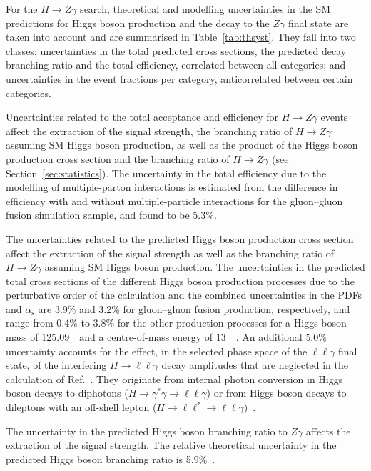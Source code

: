 For the $H\to Z\gamma$ search, theoretical and modelling uncertainties in the 
SM predictions for
Higgs boson production and the decay to the $Z\gamma$ final state are taken into account and
are summarised in Table~\ref{tab:thsyst}. 
They fall into
two classes: uncertainties in the total predicted cross sections, the predicted decay 
branching ratio and the total efficiency, correlated between all categories; 
and uncertainties in the event fractions per category, anticorrelated between certain
categories.

Uncertainties related to the total acceptance and efficiency for $H\to Z\gamma$ events
affect the extraction of the signal strength, the branching ratio of $H\to Z\gamma$
assuming SM Higgs boson production, as well as the product of the Higgs boson production
cross section and the branching ratio of $H\to Z\gamma$ (see Section~\ref{sec:statistics}).
The uncertainty in the total efficiency due to the modelling of multiple-parton 
interactions
is estimated from the difference in efficiency with and without multiple-particle interactions 
for the gluon--gluon fusion simulation sample, and found to be 5.3\%.

The uncertainties related to the predicted Higgs boson production cross section affect
the extraction of the signal strength as well as the branching ratio of $H\to Z\gamma$
assuming SM Higgs boson production.
The uncertainties in the predicted total cross sections of the different Higgs 
boson production processes due to the perturbative order of the calculation
and the combined uncertainties in the PDFs and $\alpha_\mathrm{s}$ are 3.9\% and 3.2\% for gluon--gluon fusion
production, respectively, 
and range from 0.4\% to 3.8\% for the other production processes for a Higgs boson mass of 125.09~\GeV\ and
a centre-of-mass energy of 13~\TeV~\cite{deFlorian:2016spz}.  
An additional $5.0\%$~\cite{Dicus:2013lta} uncertainty accounts for the effect, in the
selected phase space of the $\ell\ell\gamma$ final state, of the
interfering $H\to\ell\ell\gamma$ decay amplitudes
that are neglected in the
calculation of Ref.~\cite{deFlorian:2016spz}.
They originate from internal
photon conversion in Higgs boson decays to diphotons
($H\to\gamma^*\gamma\to\ell\ell\gamma$) or from
Higgs boson decays to dileptons with an off-shell lepton
($H\to\ell\ell^*\to\ell\ell\gamma$)~\cite{Chen:2012ju,Firan:2007tp}. 

The uncertainty in the predicted Higgs boson branching ratio to $Z\gamma$ affects the
extraction of the signal strength. 
The relative theoretical uncertainty in the predicted
Higgs boson branching ratio is 5.9\%~\cite{deFlorian:2016spz}.


